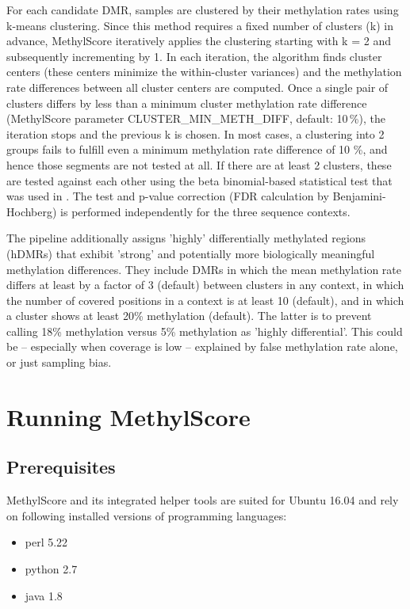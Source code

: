 \documentclass{article}
\begin{document}
For each candidate DMR, samples are clustered by their methylation rates using k-means clustering. Since this method requires a fixed number of clusters (k) in advance, MethylScore iteratively applies the clustering starting with k = 2 and subsequently incrementing by 1. In each iteration, the algorithm finds cluster centers (these centers minimize the within-cluster variances) and the methylation rate differences between all cluster centers are computed. Once a single pair of clusters differs by less than a minimum cluster methylation rate difference (MethylScore parameter CLUSTER\_MIN\_METH\_DIFF, default: 10\,\%), the iteration stops and the previous k is chosen. In most cases, a clustering into 2 groups fails to fulfill even a minimum methylation rate difference of 10 \%, and hence those segments are not tested at all. If there are at least 2 clusters, these are tested against each other using the beta binomial-based statistical test that was used in \cite{Hagmann2015}. The test and p-value correction (FDR calculation by Benjamini-Hochberg) is performed independently for the three sequence contexts.

The pipeline additionally assigns 'highly' differentially methylated regions (hDMRs) that exhibit 'strong' and potentially more biologically meaningful methylation differences. They include DMRs in which the mean methylation rate differs at least by a factor of 3 (default) between clusters in any context, in which the number of covered positions in a context is at least 10 (default), and in which a cluster shows at least 20\% methylation (default). The latter is to prevent calling 18\% methylation versus 5\% methylation as 'highly differential'. This could be -- especially when coverage is low -- explained by false methylation rate alone, or just sampling bias.



\section{Running MethylScore}

\subsection{Prerequisites}

MethylScore and its integrated helper tools are suited for Ubuntu 16.04 and rely on following installed versions of programming languages:
\begin{itemize}
	\item perl 5.22
	\item python 2.7
	\item java 1.8
\end{itemize}
\end{document}
